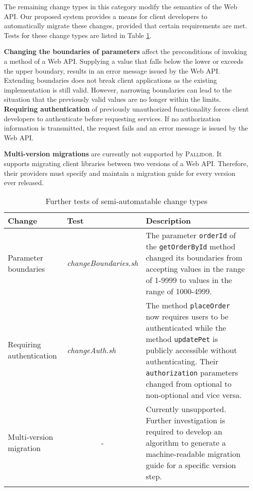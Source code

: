 The remaining change types in this category modify the semantics of the Web API. Our proposed system provides a means for client developers to automatically migrate these changes, provided that certain requirements are met. Tests for these change types are listed in Table \ref{tab:OtherSemiAutomatedChangeTypesTests}.

\textbf{Changing the boundaries of parameters} affect the preconditions of invoking a method of a Web API. Supplying a value that falls below the lower or exceeds the upper boundary,  results in an error message issued by the Web API. Extending boundaries does not break client applications as the existing implementation is still valid. However, narrowing boundaries can lead to the situation that the previously valid values are no longer within the limits.
\newpage
\textbf{Requiring authentication} of previously unauthorized functionality forces client developers to authenticate before requesting services. If no authorization information is transmitted, the request fails and an error message is issued by the Web API.

\textbf{Multi-version migrations} are currently not supported by \textsc{Pallidor}. It supports migrating client libraries between two versions of a Web API. Therefore, their providers must specify and maintain a migration guide for every version ever released.

	\begin{center}
	\begin{longtable}{@{}>{\raggedright\arraybackslash}p{}p{}p{}@{}}
		\toprule
		\textbf{Change} & \textbf{Test}  & \textbf{Description} \\ \midrule \endhead
		 Parameter boundaries &          \textit{changeBoundaries.sh}               &      The parameter \texttt{orderId} of the \texttt{getOrderById} method changed its boundaries from accepting values in the range of 1-9999 to values in the range of 1000-4999.         \\ 
		Requiring authentication &    \textit{changeAuth.sh}          &         The method \texttt{placeOrder} now requires users to be authenticated while the method \texttt{updatePet} is publicly accessible without authenticating. Their \texttt{authorization} parameters changed from optional to non-optional and vice versa.    \\
		Multi-version migration & \multicolumn{1}{c}{-}  & Currently unsupported. Further investigation is required to develop an algorithm to generate a machine-readable migration guide for a specific version step.  \\
		\bottomrule
		\caption{Further tests of semi-automatable change types}
		\label{tab:OtherSemiAutomatedChangeTypesTests}	
	\end{longtable}
\end{center}
\vspace{-1cm}


